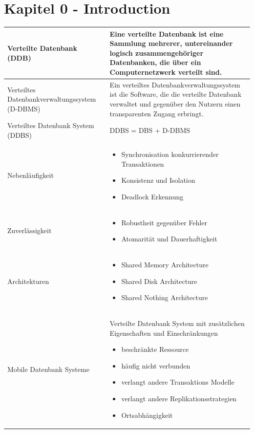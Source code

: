 \documentclass[a4paper,11pt]{article}
\begin{document}
\section{Kapitel 0 - Introduction}
\begin{tabular}{| p{5cm} | p{10cm} |}
\hline
Verteilte Datenbank (DDB) & Eine verteilte Datenbank ist eine Sammlung mehrerer, untereinander logisch zusammengehöriger Datenbanken, die über ein Computernetzwerk verteilt sind.\\ \hline
Verteiltes Datenbankverwaltungssystem (D-DBMS) & Ein verteiltes Datenbankverwaltungssystem ist die Software, die die verteilte Datenbank verwaltet und gegenüber den Nutzern einen transparenten Zugang erbringt.\\ \hline
Verteiltes Datenbank System (DDBS) & DDBS = DBS + D-DBMS\\ \hline
Nebenläufigkeit & 
\begin{itemize}
\item Synchronisation konkurrierender Transaktionen
\item Konsistenz und Isolation
\item Deadlock Erkennung
\end{itemize}\\ \hline
Zuverlässigkeit &
\begin{itemize}
\item Robustheit gegenüber Fehler
\item Atomarität und Dauerhaftigkeit
\end{itemize}\\ \hline
Architekturen &
\begin{itemize}
\item Shared Memory Architecture
\item Shared Disk Architecture
\item Shared Nothing Architecture
\end{itemize}\\ \hline
Mobile Datenbank Systeme & 
Verteilte Datenbank System mit zusätzlichen Eigenschaften und Einschränkungen
\begin{itemize}
\item beschränkte Ressource
\item häufig nicht verbunden
\item verlangt andere Transaktions Modelle
\item verlangt andere Replikationsstrategien
\item Ortsabhängigkeit
\end{itemize}\\ \hline
\end{tabular}\\
\end{document}
